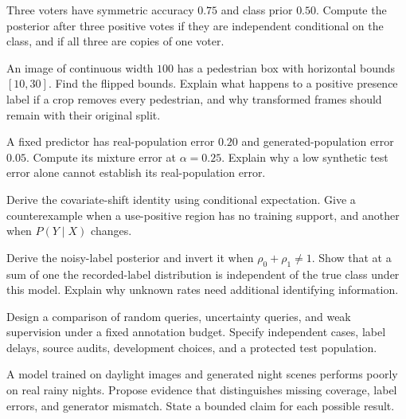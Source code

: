 \begin{exercises}
\item {}Three voters have symmetric accuracy $0.75$ and class prior $0.50$. Compute the posterior after three positive votes if they are independent conditional on the class, and if all three are copies of one voter.
\item {}An image of continuous width $100$ has a pedestrian box with horizontal bounds $[10,30]$. Find the flipped bounds. Explain what happens to a positive presence label if a crop removes every pedestrian, and why transformed frames should remain with their original split.
\item {}A fixed predictor has real-population error $0.20$ and generated-population error $0.05$. Compute its mixture error at $\alpha=0.25$. Explain why a low synthetic test error alone cannot establish its real-population error.
\end{exercises}

\par\noindent\begin{minipage}{\linewidth}
\begin{challengeexercises}
\item {}Derive the covariate-shift identity using conditional expectation. Give a counterexample when a use-positive region has no training support, and another when $P(Y\mid X)$ changes.
\item {}Derive the noisy-label posterior and invert it when $\rho_0+\rho_1\ne1$. Show that at a sum of one the recorded-label distribution is independent of the true class under this model. Explain why unknown rates need additional identifying information.
\item {}Design a comparison of random queries, uncertainty queries, and weak supervision under a fixed annotation budget. Specify independent cases, label delays, source audits, development choices, and a protected test population.
\item {}A model trained on daylight images and generated night scenes performs poorly on real rainy nights. Propose evidence that distinguishes missing coverage, label errors, and generator mismatch. State a bounded claim for each possible result.
\end{challengeexercises}
\end{minipage}
\clearpage
\begingroup\pagestyle{empty}\cleardoublepage\endgroup
\endgroup
